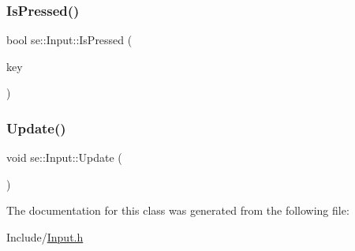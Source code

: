 \mbox{\label{classse_1_1_input_a7f63b679d5f26fd7022be7028218a3da}} 
\subsubsection{\texorpdfstring{Is\+Pressed()}{IsPressed()}}
{\footnotesize\ttfamily bool se\+::\+Input\+::\+Is\+Pressed (\begin{DoxyParamCaption}\item[{B\+Y\+TE}]{key }\end{DoxyParamCaption})}

\mbox{\label{classse_1_1_input_a823406d60664b299791026e869abe121}} 
\subsubsection{\texorpdfstring{Update()}{Update()}}
{\footnotesize\ttfamily void se\+::\+Input\+::\+Update (\begin{DoxyParamCaption}{ }\end{DoxyParamCaption})}



The documentation for this class was generated from the following file\+:\begin{DoxyCompactItemize}
\item 
Include/\mbox{\hyperlink{_input_8h}{Input.\+h}}\end{DoxyCompactItemize}
